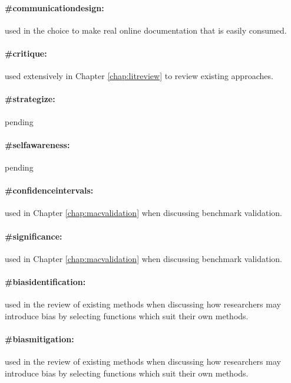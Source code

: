 \documentclass[./main.tex]{subfiles}
\begin{document}
\paragraph*{\textbf{\#communicationdesign:}}\label{hc:communicationdesign} used in the choice to make real online documentation that is easily consumed.

\paragraph*{\textbf{\#critique:}}\label{hc:critique} used extensively in Chapter \ref{chap:litreview} to review existing approaches.

\paragraph*{\textbf{\#strategize:}}\label{hc:strategize} pending
\paragraph*{\textbf{\#selfawareness:}}\label{hc:selfawareness} pending

\paragraph*{\textbf{\#confidenceintervals:}}\label{hc:confidenceintervals} used in Chapter \ref{chap:macvalidation} when discussing benchmark validation.

\paragraph*{\textbf{\#significance:}}\label{hc:significance} used in Chapter \ref{chap:macvalidation} when discussing benchmark validation.

\paragraph*{\textbf{\#biasidentification:}}\label{hc:biasidentification} used in the review of existing methods when discussing how researchers may introduce bias by selecting functions which suit their own methods.
\paragraph*{\textbf{\#biasmitigation:}}\label{hc:biasmitigation} used in the review of existing methods when discussing how researchers may introduce bias by selecting functions which suit their own methods.
\end{document}
